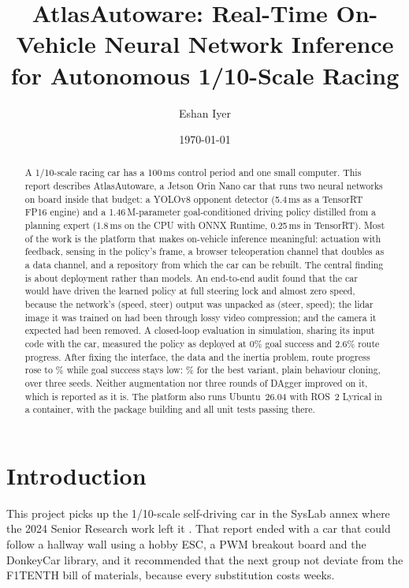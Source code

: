 \documentclass[12pt]{article}
\title{AtlasAutoware: Real-Time On-Vehicle Neural Network Inference\\
for Autonomous 1/10-Scale Racing}
\author{Eshan Iyer}
\date{\today}
\begin{document}
\maketitle

\begin{abstract}
\noindent A 1/10-scale racing car has a 100\,ms control period and one small computer. This
report describes AtlasAutoware, a Jetson Orin Nano car that runs two neural networks on board
inside that budget: a YOLOv8 opponent detector (5.4\,ms as a TensorRT FP16 engine) and a
1.46\,M-parameter goal-conditioned driving policy distilled from a planning expert (1.8\,ms on
the CPU with ONNX Runtime, 0.25\,ms in TensorRT). Most of the work is the platform that makes
on-vehicle inference meaningful: actuation with feedback, sensing in the policy's frame, a
browser teleoperation channel that doubles as a data channel, and a repository from which the
car can be rebuilt. The central finding is about deployment rather than models. An end-to-end
audit found that the car would have driven the learned policy at full steering lock and almost
zero speed, because the network's (speed, steer) output was unpacked as (steer, speed); the lidar
image it was trained on had been through lossy video compression; and the camera it expected
had been removed. A closed-loop evaluation in simulation, sharing its input code with the car,
measured the policy as deployed at 0\% goal success and 2.6\% route progress. After fixing the
interface, the data and the inertia problem, route progress rose to \resBcNomProg\% while goal
success stays low: \resBcNomSucc\% for the best variant, plain behaviour cloning, over three seeds.
Neither augmentation nor three rounds of DAgger improved on it, which is reported as it is. The platform also runs Ubuntu~26.04 with ROS~2 Lyrical in a container, with the
package building and all unit tests passing there.
\end{abstract}

\section*{Introduction}

This project picks up the 1/10-scale self-driving car in the SysLab annex where the
2024 Senior Research work left it \cite{gagvani2024}. That report ended with a car
that could follow a hallway wall using a hobby ESC, a PWM breakout board and the
DonkeyCar library, and it recommended that the next group not deviate from the
F1TENTH bill of materials, because every substitution costs weeks.
\end{document}
